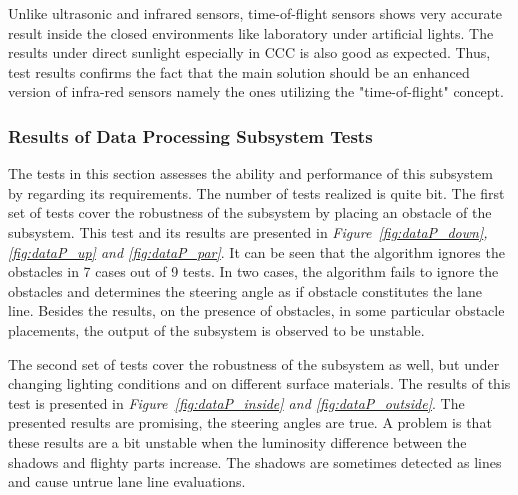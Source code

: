 \documentclass[a4paper,12pt]{article}
\begin{document}
Unlike ultrasonic and infrared sensors, time-of-flight sensors shows very accurate result inside the closed environments like laboratory under artificial lights. The results under direct sunlight especially in CCC is also good as expected.  Thus, test results confirms the fact that the main solution should be an enhanced version of infra-red sensors namely the ones utilizing the "time-of-flight" concept. 










\subsubsection*{Results of Data Processing Subsystem Tests}\label{sec:DataProcessingSubsystemTests}

The tests in this section assesses the ability and performance of this subsystem by regarding its requirements. The number of tests realized is quite  bit. The first set of tests cover the robustness of the subsystem by placing an obstacle of the subsystem. This test and its results are presented in \textit{Figure~\ref{fig:dataP_down},\ref{fig:dataP_up} and \ref{fig:dataP_par}}. It can be seen that the algorithm ignores the obstacles in 7 cases out of 9 tests. In two cases, the algorithm fails to ignore the obstacles and determines the steering angle as if obstacle constitutes the lane line. Besides the results, on the presence of obstacles, in some particular obstacle placements, the output of the subsystem is observed to be unstable.


The second set of tests cover the robustness of the subsystem as well, but under changing lighting conditions and on different surface materials. The results of this test is presented in \textit{Figure~\ref{fig:dataP_inside} and \ref{fig:dataP_outside}}. The presented results are promising, the steering angles are true. A problem is that these results are a bit unstable when the luminosity difference between the shadows and flighty parts increase. The shadows are sometimes detected as lines and cause untrue lane line evaluations.	
\end{document}
